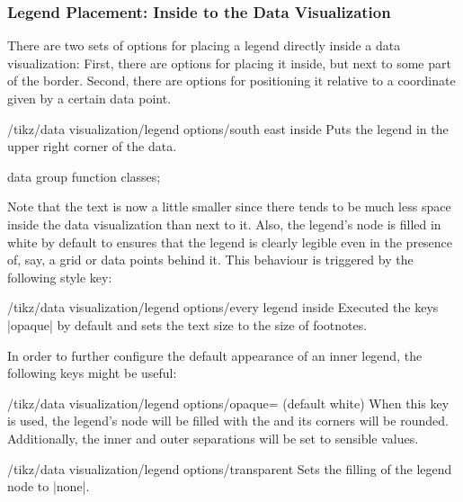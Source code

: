 \subsubsection{Legend Placement: Inside to the Data Visualization}
\label{section-dv-legend-inside}

There are two sets of options for placing a legend directly inside a
data visualization: First, there are options for placing it inside,
but next to some part of the border. Second, there are options for
positioning it relative to a coordinate given by a certain data point.



\begin{key}{/tikz/data visualization/legend options/south east inside}
  Puts the legend in the upper right corner of the data.
\begin{codeexample}[width=8cm]
\tikz \datavisualization [
  scientific axes, 
  visualize as smooth line/.list=
    {log, lin},
  legend=south east inside,
  log=    {label in legend={text=$\log x$}},
  lin=    {label in legend={text=$x/2$}},
  style sheet=strong colors]
data group {function classes};
\end{codeexample}  

  Note that the text is now a little smaller since there tends to be
  much less space inside the data visualization than next to it. Also,
  the legend's node is filled in white by default to ensures that the
  legend is clearly legible even in the presence of, say, a grid or
  data points behind it. This behaviour is triggered by the following
  style key:

  \begin{stylekey}{/tikz/data visualization/legend options/every legend inside}
    Executed the keys |opaque| by default and sets the  text size to
    the size of footnotes.
  \end{stylekey}
\end{key}

In order to further configure the default appearance of an inner
legend, the following keys might be useful:

\begin{key}{/tikz/data visualization/legend
    options/opaque= (default white)}
  When this key is used, the legend's node will be filled with the
   and its corners will be rounded. Additionally, the
  inner and outer separations will be set to sensible values.  
\end{key}
\begin{key}{/tikz/data visualization/legend
    options/transparent}
  Sets the filling of the legend node to |none|.
\end{key}

